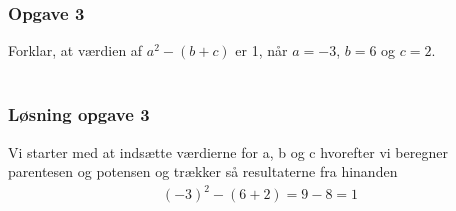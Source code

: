 \subsubsection{Opgave 3}

Forklar, at værdien af $a^2 - (b+c)$ er 1, når $a = -3$, $b = 6$ og $c = 2$.\\\\

\subsubsection*{Løsning opgave 3}
Vi starter med at indsætte værdierne for a, b og c hvorefter vi beregner parentesen og potensen og trækker så resultaterne fra hinanden
\begin{align*}
    (-3)^2 - (6 + 2) = 9 - 8 = 1
\end{align*}

